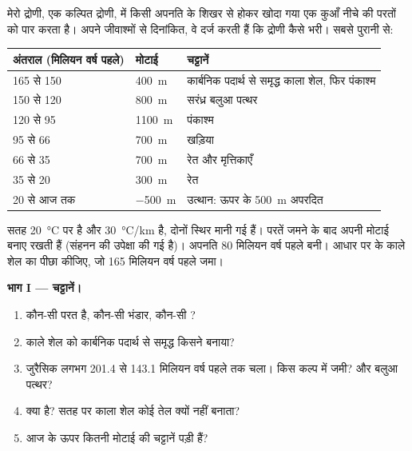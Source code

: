 \begin{problem}[{सप्ताहांत समस्या --- एक कल्पित द्रोणी के तेल का काल-निर्धारण}]
\label{pb:g11:fossil-fuel-geology:1}
मेरो द्रोणी, एक कल्पित द्रोणी, में किसी अपनति के शिखर से होकर खोदा गया एक कुआँ
नीचे की परतों को पार करता है। अपने जीवाश्मों से दिनांकित, वे
दर्ज करती हैं कि द्रोणी कैसे भरी। सबसे पुरानी से:
\begin{center}
\small
\begin{tabular}{|l|l|l|}
\hline
\textbf{अंतराल (मिलियन वर्ष पहले)} & \textbf{मोटाई} & \textbf{चट्टानें} \\
\hline
165 से 150 & \qty{400}{m} & कार्बनिक पदार्थ से समृद्ध काला शेल, फिर पंकाश्म \\
150 से 120 & \qty{800}{m} & सरंध्र बलुआ पत्थर \\
120 से 95 & \qty{1100}{m} & पंकाश्म \\
95 से 66 & \qty{700}{m} & खड़िया \\
66 से 35 & \qty{700}{m} & रेत और मृत्तिकाएँ \\
35 से 20 & \qty{300}{m} & रेत \\
20 से आज तक & \qty{-500}{m} & उत्थान: ऊपर के \qty{500}{m} अपरदित \\
\hline
\end{tabular}
\end{center}
सतह \qty{20}{\degreeCelsius} पर है और 
\qty{30}{\degreeCelsius/km} है, दोनों स्थिर मानी गई हैं। परतें जमने के बाद अपनी
मोटाई बनाए रखती हैं (संहनन की उपेक्षा की गई है)। अपनति 80
मिलियन वर्ष पहले बनी। आधार पर के काले शेल का पीछा कीजिए, जो 165 मिलियन
वर्ष पहले जमा।

\medskip
\noindent\textbf{भाग I --- चट्टानें।}
\begin{enumerate}
  \item कौन-सी परत  है, कौन-सी भंडार, कौन-सी ?
  \item काले शेल को कार्बनिक पदार्थ से समृद्ध किसने बनाया?
  \item जुरैसिक लगभग \num{201.4} से \num{143.1} मिलियन
        वर्ष पहले तक चला।  किस कल्प में जमी? और
        बलुआ पत्थर?
  \item {} क्या है? सतह पर काला शेल कोई तेल क्यों नहीं
        बनाता?
  \item आज  के ऊपर कितनी मोटाई की चट्टानें पड़ी हैं?
\end{enumerate}


\end{problem}
